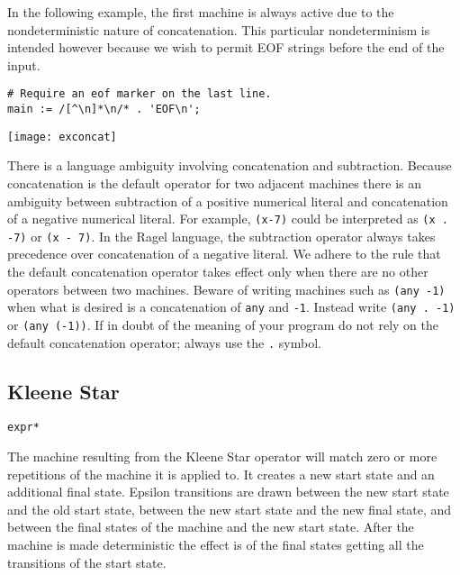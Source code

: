 \documentclass[letterpaper,11pt,oneside]{book}
\newcommand{\verbspace}{\vspace{10pt}}
\newcommand{\graphspace}{\vspace{10pt}}
\newenvironment{inline_code}{\def\baselinestretch{1}\vspace{12pt}\small}{}
\begin{document}
In the following example, the first machine is always active due to the
nondeterministic nature of concatenation. This particular nondeterminism is intended
however because we wish to permit EOF strings before the end of the input.

\begin{inline_code}
\begin{verbatim}
# Require an eof marker on the last line.
main := /[^\n]*\n/* . 'EOF\n';
\end{verbatim}
\end{inline_code}
\verbspace
% }%%
% END GENERATE

\graphspace
\begin{center}
\texttt{[image: exconcat]}
\end{center}
\graphspace

There is a language
ambiguity involving concatenation and subtraction. Because concatenation is the 
default operator for two
adjacent machines there is an ambiguity between subtraction of
a positive numerical literal and concatenation of a negative numerical literal.
For example, \verb|(x-7)| could be interpreted as \verb|(x . -7)| or 
\verb|(x - 7)|. In the Ragel language, the subtraction operator always takes precedence
over concatenation of a negative literal. We adhere to the rule that the default
concatenation operator takes effect only when there are no other operators between
two machines. Beware of writing machines such as \verb|(any -1)| when what is
desired is a concatenation of \verb|any| and \verb|-1|. Instead write 
\verb|(any . -1)| or \verb|(any (-1))|. If in doubt of the meaning of your program do not
rely on the default concatenation operator; always use the \verb|.| symbol.


\subsection{Kleene Star}

\verb|expr*|

The machine resulting from the Kleene Star operator will match zero or more
repetitions of the machine it is applied to.
It creates a new start state and an additional final
state.  Epsilon transitions are drawn between the new start state and the old start
state, between the new start state and the new final state, and
between the final states of the machine and the new start state.  After the
machine is made deterministic the effect is of the final states getting all the
transitions of the start state. 
\end{document}
